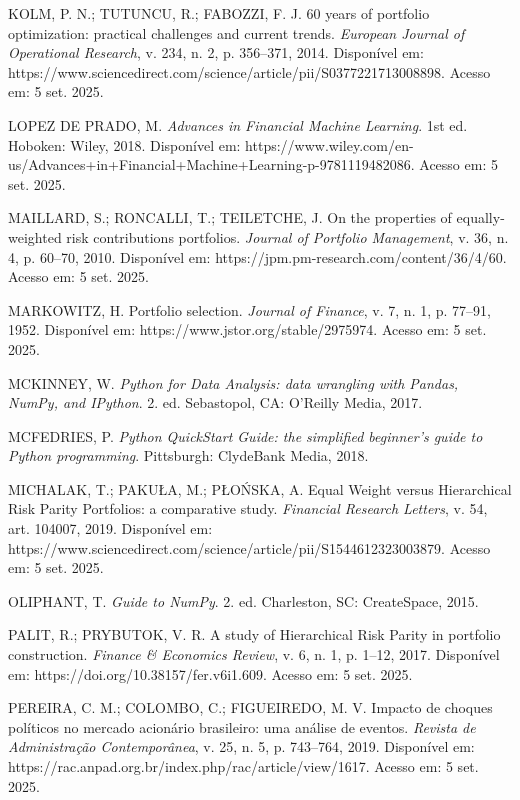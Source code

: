 \begin{thebibliography}{99}
KOLM, P. N.; TUTUNCU, R.; FABOZZI, F. J. 60 years of portfolio optimization: practical challenges and current trends. \textit{European Journal of Operational Research}, v. 234, n. 2, p. 356--371, 2014. Disponível em: https://www.sciencedirect.com/science/article/pii/S0377221713008898. Acesso em: 5 set. 2025.

LOPEZ DE PRADO, M. \textit{Advances in Financial Machine Learning}. 1st ed. Hoboken: Wiley, 2018. Disponível em: https://www.wiley.com/en-us/Advances+in+Financial+Machine+Learning-p-9781119482086. Acesso em: 5 set. 2025.

MAILLARD, S.; RONCALLI, T.; TEILETCHE, J. On the properties of equally-weighted risk contributions portfolios. \textit{Journal of Portfolio Management}, v. 36, n. 4, p. 60--70, 2010. Disponível em: https://jpm.pm-research.com/content/36/4/60. Acesso em: 5 set. 2025.

MARKOWITZ, H. Portfolio selection. \textit{Journal of Finance}, v. 7, n. 1, p. 77--91, 1952. Disponível em: https://www.jstor.org/stable/2975974. Acesso em: 5 set. 2025.

MCKINNEY, W. \textit{Python for Data Analysis: data wrangling with Pandas, NumPy, and IPython}. 2. ed. Sebastopol, CA: O'Reilly Media, 2017.

MCFEDRIES, P. \textit{Python QuickStart Guide: the simplified beginner's guide to Python programming}. Pittsburgh: ClydeBank Media, 2018.

MICHALAK, T.; PAKUŁA, M.; PŁOŃSKA, A. Equal Weight versus Hierarchical Risk Parity Portfolios: a comparative study. \textit{Financial Research Letters}, v. 54, art. 104007, 2019. Disponível em: https://www.sciencedirect.com/science/article/pii/S1544612323003879. Acesso em: 5 set. 2025.

OLIPHANT, T. \textit{Guide to NumPy}. 2. ed. Charleston, SC: CreateSpace, 2015.

PALIT, R.; PRYBUTOK, V. R. A study of Hierarchical Risk Parity in portfolio construction. \textit{Finance \& Economics Review}, v. 6, n. 1, p. 1--12, 2017. Disponível em: https://doi.org/10.38157/fer.v6i1.609. Acesso em: 5 set. 2025.

PEREIRA, C. M.; COLOMBO, C.; FIGUEIREDO, M. V. Impacto de choques políticos no mercado acionário brasileiro: uma análise de eventos. \textit{Revista de Administração Contemporânea}, v. 25, n. 5, p. 743--764, 2019. Disponível em: https://rac.anpad.org.br/index.php/rac/article/view/1617. Acesso em: 5 set. 2025.


\end{thebibliography}
